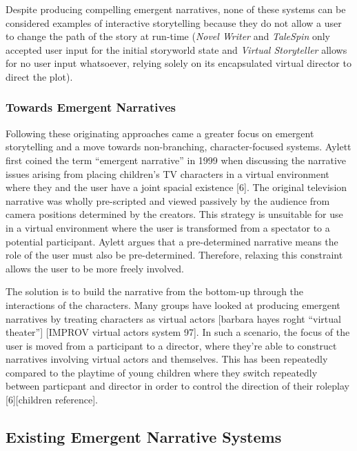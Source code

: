 \documentclass{sig-alternate-05-2015}
\begin{document}
Despite producing compelling emergent narratives, none of these systems can be considered examples of interactive storytelling because they do not allow a user to change the path of the story at run-time (\textit{Novel Writer} and \textit{TaleSpin} only accepted user input for the initial storyworld state and \textit{Virtual Storyteller} allows for no user input whatsoever, relying solely on its encapsulated virtual director to direct the plot).\\

\subsubsection{Towards Emergent Narratives}

\noindent Following these originating approaches came a greater focus on emergent storytelling and a move towards non-branching, character-focused systems. Aylett first coined the term ``emergent narrative'' in 1999 when discussing the narrative issues arising from placing children's TV characters in a virtual environment where they and the user have a joint spacial existence [6]. The original television narrative was wholly pre-scripted and viewed passively by the audience from camera positions determined by the creators. This strategy is unsuitable for use in a virtual environment where the user is transformed from a spectator to a potential participant. Aylett argues that a pre-determined narrative means the role of the user must also be pre-determined. Therefore, relaxing this constraint allows the user to be more freely involved.

The solution is to build the narrative from the bottom-up through the interactions of the characters. Many groups have looked at producing emergent narratives by treating characters as virtual actors [barbara hayes roght ``virtual theater''] [IMPROV virtual actors system 97]. In such a scenario, the focus of the user is moved from a participant to a director, where they're able to construct narratives involving virtual actors and themselves. This has been repeatedly compared to the playtime of young children where they switch repeatedly between particpant and director in order to control the direction of their roleplay [6][children reference]. 

\subsection{Existing Emergent Narrative Systems}
\end{document}
